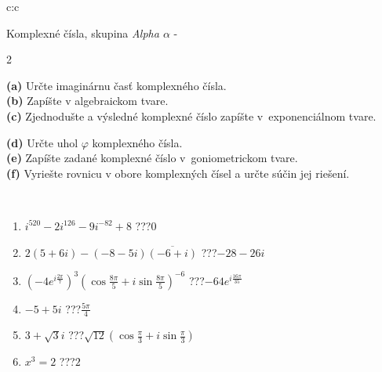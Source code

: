 \documentclass[10pt]{report}
\begin{document}
\thispagestyle{empty}
\begin{tabular}{c:c}
\begin{minipage}[c][104.5mm][t]{0.5\linewidth}
\begin{center}
\vspace{7mm}
{\huge Komplexné čísla, skupina \textit{Alpha $\alpha$} -}\\[5mm]
\begin{minipage}{0.95\linewidth}
\begin{center}
{\small \begin{multicols}{2} \raggedright
\textbf{(a)} Určte imaginárnu časť komplexného čísla. \\[1mm]
\textbf{(b)} Zapíšte v algebraickom tvare. \\[1mm]
\textbf{(c)} Zjednodušte a výsledné komplexné číslo zapíšte v~exponenciálnom tvare. \par \columnbreak
\textbf{(d)} Určte uhol \(\varphi\) komplexného čísla. \\[1mm]
\textbf{(e)} Zapíšte zadané komplexné číslo v~goniometrickom tvare. \\[1mm]
\textbf{(f)} Vyriešte rovnicu v obore komplexných čísel a určte súčin jej riešení.
\end{multicols}
}
\end{center}
\end{minipage}
\\[4mm]
\begin{minipage}{0.79\linewidth}
\begin{center}
\begin{varwidth}{\linewidth}
\begin{enumerate}
\large
\item $i^{520}-2i^{126}-9i^{-82}+8$\quad \dotfill\; ???\;\dotfill \quad $0$
\item $2(5+6i)-(-8-5i)\overline{(-6+i)}$\quad \dotfill\; ???\;\dotfill \quad $-28-26i$
\item $\left(-4e^{i\frac{2\pi}{7}}\right)^{3}\left(\cos{\frac{8\pi}{5}}+i\sin{\frac{8\pi}{5}}\right)^{-6}$\quad \dotfill\; ???\;\dotfill \quad $-64e^{i\frac{16\pi}{35}}$
\item $-5+5i$\quad \dotfill\; ???\;\dotfill \quad $\frac{5\pi}{4}$
\item $3+\sqrt{3}i$\quad \dotfill\; ???\;\dotfill \quad $\sqrt{12}\left(\cos{\frac{\pi}{3}}+i\sin{\frac{\pi}{3}}\right)$
\item $x^3=2$\quad \dotfill\; ???\;\dotfill \quad $2$
\end{enumerate}
\end{varwidth}

\end{center}
\end{minipage}
\end{center}
\end{minipage}
\end{tabular}
\end{document}
